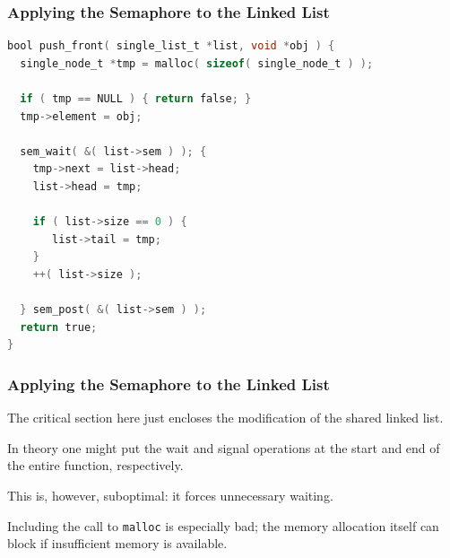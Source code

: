 \begin{frame}[fragile]
\frametitle{Applying the Semaphore to the Linked List}

\begin{lstlisting}[language=C]
bool push_front( single_list_t *list, void *obj ) {
  single_node_t *tmp = malloc( sizeof( single_node_t ) );
  
  if ( tmp == NULL ) { return false; }  
  tmp->element = obj;

  sem_wait( &( list->sem ) ); {  
    tmp->next = list->head;
    list->head = tmp;

    if ( list->size == 0 ) {
       list->tail = tmp;
    }
    ++( list->size );
  
  } sem_post( &( list->sem ) );
  return true;
}
\end{lstlisting}


\end{frame}

\begin{frame}
\frametitle{Applying the Semaphore to the Linked List}

The critical section here just encloses the modification of the shared linked list. 

In theory one might put the wait and signal operations at the start and end of the entire function, respectively. 

This is, however, suboptimal: it forces unnecessary waiting. 

Including the call to \texttt{malloc} is especially bad; the memory allocation itself can block if insufficient memory is available. 

\end{frame}



